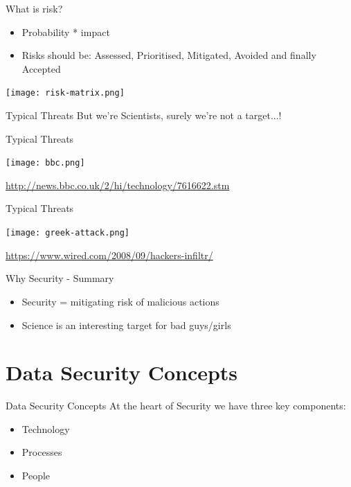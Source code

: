 \documentclass[aspectratio=169]{beamer}
\begin{document}
\begin{frame}{What is risk?}
    \begin{itemize}
		\item Probability * impact
		\item Risks should be: Assessed, Prioritised, Mitigated, Avoided and finally Accepted
	\end{itemize}
    \begin{center} 
      \texttt{[image: risk-matrix.png]} 
    \end{center}
\end{frame}

\begin{frame}{Typical Threats}
\center 
But we're Scientists, surely we're not a target...! 
\end{frame}

\begin{frame}{Typical Threats}
  \begin{center}
		\texttt{[image: bbc.png]} \newline
        {\small \url{http://news.bbc.co.uk/2/hi/technology/7616622.stm} \par}
  \end{center}
\end{frame}

\begin{frame}{Typical Threats}
  \begin{center}
      \texttt{[image: greek-attack.png]}  \newline
  	 {\small \url{https://www.wired.com/2008/09/hackers-infiltr/} \par}
  \end{center}
\end{frame}


\begin{frame}{Why Security - Summary}
\begin{itemize}
\item Security = mitigating risk of malicious actions
\item Science is an interesting target for bad guys/girls
\end{itemize}
\end{frame}

\section{Data Security Concepts}
\frame{\sectionpage}

\begin{frame}{Data Security Concepts}
At the heart of Security we have three key components:
	\begin{itemize}
		\item Technology
		\item Processes
        \item People
	\end{itemize}
\end{frame}
\end{document}
